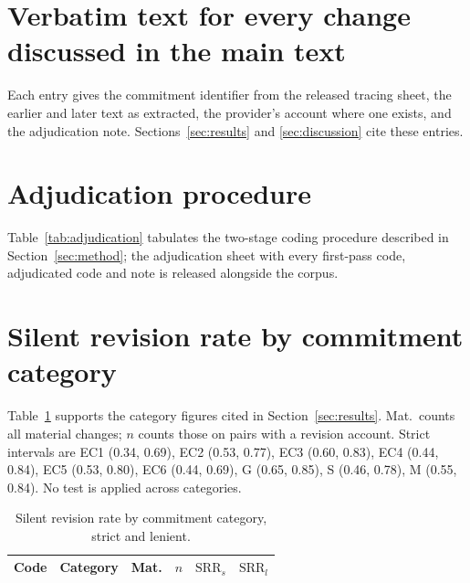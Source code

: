 \documentclass{article}
\newcommand{\srr}{\mathrm{SRR}}
\begin{document}
\section{Verbatim text for every change discussed in the main text}
\label{apx:examples}
Each entry gives the commitment identifier from the released tracing sheet, the earlier and later text as extracted, the provider's account where one exists, and the adjudication note. Sections~\ref{sec:results} and \ref{sec:discussion} cite these entries.
\sloppy


\section{Adjudication procedure}
\label{apx:adjudication}
Table~\ref{tab:adjudication} tabulates the two-stage coding procedure described in Section~\ref{sec:method}; the adjudication sheet with every first-pass code, adjudicated code and note is released alongside the corpus.
\begin{table}[H]\centering\small
\caption{Coding and adjudication counts.}
\label{tab:adjudication}

\end{table}

\section{Silent revision rate by commitment category}
\label{apx:category}
Table~\ref{tab:cat} supports the category figures cited in Section~\ref{sec:results}. Mat.\ counts all material changes; $n$ counts those on pairs with a revision account. Strict intervals are EC1 (0.34, 0.69), EC2 (0.53, 0.77), EC3 (0.60, 0.83), EC4 (0.44, 0.84), EC5 (0.53, 0.80), EC6 (0.44, 0.69), G (0.65, 0.85), S (0.46, 0.78), M (0.55, 0.84). No test is applied across categories.
\begin{table}[H]\centering\small
\caption{Silent revision rate by commitment category, strict and lenient.}
\label{tab:cat}
\begin{tabular}{llrrrr}
\toprule Code & Category & Mat. & $n$ & $\srr_s$ & $\srr_l$ \\ \midrule

\end{tabular}
\end{table}

\clearpage
\end{document}
